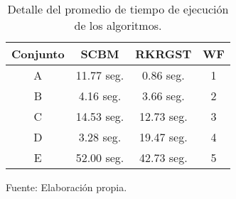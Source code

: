 \begin{table}[H]
\centering
\begin{tabular}{|c||c||c||c|}
\hline
Conjunto & SCBM & RKRGST & WF \\ \hline
A & 11.77 seg.  & 0.86 seg. &1  \\ \hline
B & 4.16 seg.  & 3.66 seg. &2 \\ \hline
C & 14.53 seg.  & 12.73 seg. &3  \\ \hline
D & 3.28 seg.  & 19.47 seg. &4 \\ \hline
E & 52.00 seg.  & 42.73 seg. &5 \\ \hline
\end{tabular}
\caption{Detalle del promedio de tiempo de ejecución de los algoritmos.}
Fuente: Elaboración propia.
\label{pruebaTiempo}
\end{table}
